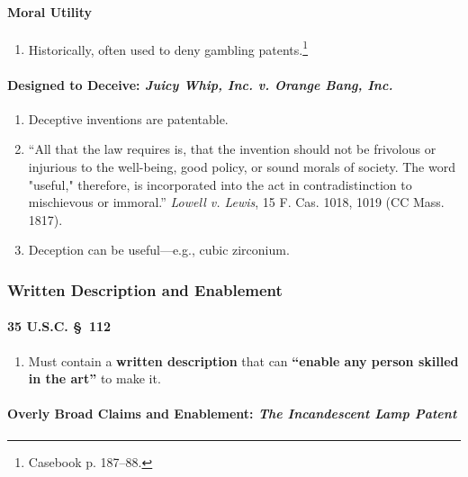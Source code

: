 \paragraph{Moral Utility}

\begin{enumerate}
    \item Historically, often used to deny gambling patents.\footnote{Casebook 
    p. 187--88.}
\end{enumerate}

\paragraph{Designed to Deceive: \emph{Juicy Whip, Inc. v. Orange Bang, Inc.}} 

\begin{enumerate}
    \item Deceptive inventions are patentable.
    \item ``All that the law requires is, that the invention should not be 
    frivolous or injurious to the well-being, good policy, or sound morals of 
    society. The word "useful," therefore, is incorporated into the act in 
    contradistinction to mischievous or immoral.'' \emph{Lowell v. Lewis}, 15 
    F. Cas. 1018, 1019 (CC Mass. 1817).
    \item Deception can be useful---e.g., cubic zirconium.
\end{enumerate}

\subsubsection{Written Description and Enablement}

\paragraph{35 U.S.C. \S\ 112}

\begin{enumerate}
    \item Must contain a \textbf{written description} that can 
    \textbf{``enable any person skilled in the art''} to make it.
\end{enumerate}

\paragraph{Overly Broad Claims and Enablement: \emph{The Incandescent Lamp 
Patent}}

